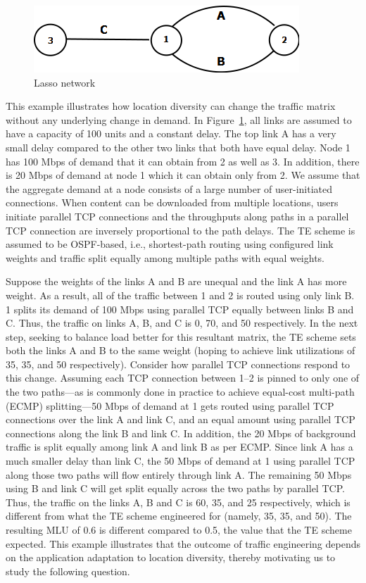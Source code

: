 \begin{figure}[tbh]
	\centering
	\label{fig:3node-bg}\includegraphics[scale=0.5]{final_images/Diagram3node.png}
	\caption{Lasso network}
\end{figure}

This example illustrates how location diversity can change the traffic matrix without any underlying change in demand. In Figure~\ref{fig:3node-bg}, all links are assumed to have a capacity of 100 units and a constant delay. The top link A has a very small delay compared to the other two links that both have equal delay. Node 1 has 100 Mbps of demand that it can obtain from 2 as well as 3. In addition, there is 20 Mbps of demand at node 1 which it can obtain only from 2.  We assume that the aggregate demand at a node consists of a large number of user-initiated connections. When content can be downloaded from multiple locations, users initiate parallel TCP connections and the throughputs along paths in a parallel TCP connection are inversely proportional to the path delays. The TE scheme is assumed to be OSPF-based, i.e., shortest-path routing using configured link weights and traffic split equally among multiple paths with equal weights.

Suppose the weights of the links A and B are unequal and the link A has more weight. As a result, all of the traffic between 1 and 2 is routed using only link B. 1 splits its demand of 100 Mbps using parallel TCP equally between links B and C. Thus, the traffic on links A, B, and C is  0, 70, and 50 respectively. In the next step, seeking to balance load better for this resultant matrix, the TE scheme sets both the links A and B to the same weight (hoping to achieve link utilizations of 35, 35, and 50 respectively).  Consider how parallel TCP connections respond to this change. Assuming each TCP connection between 1--2 is pinned to only one of the two paths---as is commonly done in practice to achieve equal-cost multi-path (ECMP) splitting---50 Mbps of demand at 1 gets routed using parallel TCP connections over the link A and link C, and an equal amount using parallel TCP connections along the link B and link C. In addition, the 20 Mbps of background traffic is split equally among link A and link B as per ECMP.  Since link A has a much smaller delay than link C, the 50 Mbps of demand at 1 using parallel TCP along those two paths will flow entirely through link A. The remaining 50 Mbps using B and link C will get split equally across the two paths by parallel TCP. Thus, the traffic on the links A, B and C is 60, 35, and 25 respectively, which is different from what the TE scheme engineered for (namely, 35, 35, and 50). The resulting MLU of 0.6 is different compared to 0.5, the value that the TE scheme expected. This example illustrates that the outcome of traffic engineering depends on the application adaptation to location diversity, thereby motivating us to study the following question.

